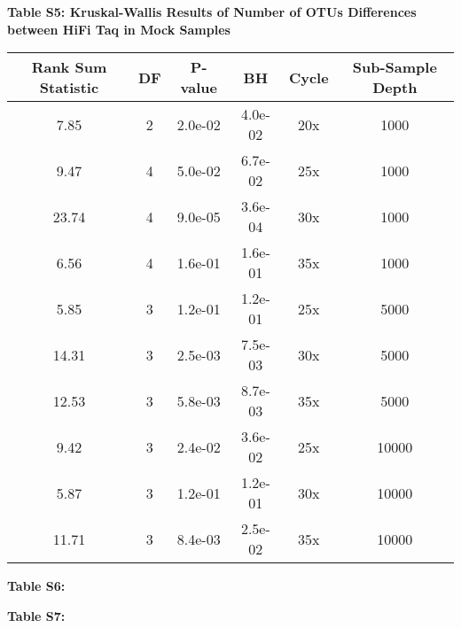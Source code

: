 \documentclass[12pt,]{article}
\begin{document}
\newpage

\textbf{Table S5: Kruskal-Wallis Results of Number of OTUs Differences
between HiFi Taq in Mock Samples}

\begin{longtable}[]{@{}cccccc@{}}
\toprule
Rank Sum Statistic & DF & P-value & BH & Cycle & Sub-Sample
Depth\tabularnewline
\midrule
\endhead
7.85 & 2 & 2.0e-02 & 4.0e-02 & 20x & 1000\tabularnewline
9.47 & 4 & 5.0e-02 & 6.7e-02 & 25x & 1000\tabularnewline
23.74 & 4 & 9.0e-05 & 3.6e-04 & 30x & 1000\tabularnewline
6.56 & 4 & 1.6e-01 & 1.6e-01 & 35x & 1000\tabularnewline
5.85 & 3 & 1.2e-01 & 1.2e-01 & 25x & 5000\tabularnewline
14.31 & 3 & 2.5e-03 & 7.5e-03 & 30x & 5000\tabularnewline
12.53 & 3 & 5.8e-03 & 8.7e-03 & 35x & 5000\tabularnewline
9.42 & 3 & 2.4e-02 & 3.6e-02 & 25x & 10000\tabularnewline
5.87 & 3 & 1.2e-01 & 1.2e-01 & 30x & 10000\tabularnewline
11.71 & 3 & 8.4e-03 & 2.5e-02 & 35x & 10000\tabularnewline
\bottomrule
\end{longtable}

\newpage

\textbf{Table S6: }

\newpage

\textbf{Table S7: }
\end{document}
